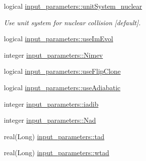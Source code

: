 \begin{DoxyCompactItemize}
logical \hyperlink{namespaceinput__parameters_a65ef9c71ef768c5f3b871cae9143108e}{input\_\-parameters::unitSystem\_\-nuclear}
\begin{DoxyCompactList}\small\item\em Use unit system for nuclear collision \mbox{[}default\mbox{]}. \item\end{DoxyCompactList}\item 
logical \hyperlink{namespaceinput__parameters_a9672a1c90e65a2ecee350dd2dae64e03}{input\_\-parameters::useImEvol}
\item 
integer \hyperlink{namespaceinput__parameters_ac0212885e38ab22a77411b20bec16420}{input\_\-parameters::Nimev}
\item 
logical \hyperlink{namespaceinput__parameters_a504b6e2c93e4a4af47125d83d6e5d75d}{input\_\-parameters::useFlipClone}
\item 
logical \hyperlink{namespaceinput__parameters_ac1165234d614ad278effaf2a7910888b}{input\_\-parameters::useAdiabatic}
\item 
integer \hyperlink{namespaceinput__parameters_a2b1e4d8baaa62168d989002cf747b30b}{input\_\-parameters::iadib}
\item 
integer \hyperlink{namespaceinput__parameters_a6e8306262594749651ff9230cb525363}{input\_\-parameters::Nad}
\item 
real(Long) \hyperlink{namespaceinput__parameters_ab3ac3c45168fc6aafd02e70822154417}{input\_\-parameters::tad}
\item 
real(Long) \hyperlink{namespaceinput__parameters_a8d452c8a3d45ee77279fc26867c74ed6}{input\_\-parameters::wtad}
\end{DoxyCompactItemize}
